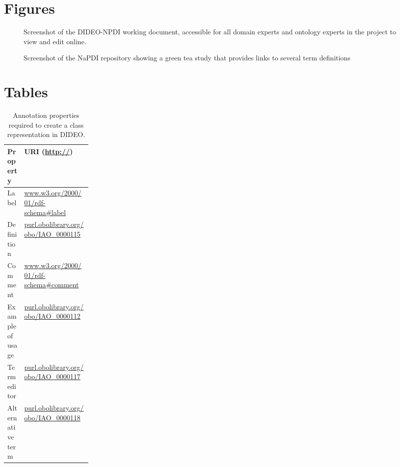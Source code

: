 \documentclass{bmcart}
\def\texttt{[image: ]}
\begin{document}
\begin{backmatter}

\section*{Figures}

\begin{figure}[!h]
    \centering
    \caption{Screenshot of the DIDEO-NPDI working document, accessible for all domain experts and ontology experts in the project to view and edit online.}
    \label{napdi_screenshot}
\end{figure}

\begin{figure}[!h]
    \centering
    \caption{Screenshot of the NaPDI repository showing a green tea study that provides links to several term definitions}
    \label{napdi_study}
\end{figure}


\section*{Tables}
\begin{table}[h!]
\caption{Annotation properties required to create a class representation in DIDEO. \label{Tab:01}}
{\begin{tabular}{|p{0.2\linewidth}|l|} \hline
        \textbf{Property} &
        \textbf{URI (\url{http://})}\\ \hline
    Label & \url{www.w3.org/2000/01/rdf-schema#label} \\ \hline
    Definition & \url{purl.obolibrary.org/obo/IAO_0000115} \\ \hline
    Comment & \url{www.w3.org/2000/01/rdf-schema#comment} \\ \hline
    \multicolumn{1}{|l|}{Example of usage} & \url{purl.obolibrary.org/obo/IAO_0000112} \\ \hline
    Term editor & \url{purl.obolibrary.org/obo/IAO_0000117} \\ \hline
    Alternative term & \url{purl.obolibrary.org/obo/IAO_0000118} \\ \hline
    \end{tabular}}
    \label{annotation_properties}
\end{table}


\end{backmatter}
\end{document}
